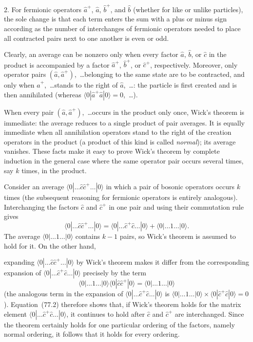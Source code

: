 2. For fermionic operators $\hat a^+$, $\hat a$, $\hat b^+$, and $\hat b$ (whether for like or unlike particles), the sole change is that each term enters the sum with a plus or minus sign according as the number of interchanges of fermionic operators needed to place all contracted pairs next to one another is even or odd.

Clearly, an average can be nonzero only when every factor $\hat a$, $\hat b$, or $\hat c$ in the product is accompanied by a factor $\hat a^+$, $\hat b^+$, or $\hat c^+$, respectively. Moreover, only operator pairs $(\hat a,\hat a^+)$,~\ldots belonging to the same state are to be contracted, and only when $\hat a^+$,~\ldots stands to the right of $\hat a$,~\ldots: the particle is first created and is then annihilated (whereas $\langle0|\hat a^+\hat a|0\rangle=0$,~\ldots).

When every pair $(\hat a,\hat a^+)$,~\ldots occurs in the product only once, Wick's theorem is immediate: the average reduces to a single product of pair averages. It is equally immediate when all annihilation operators stand to the right of the creation operators in the product (a product of this kind is called \emph{normal}); its average vanishes. These facts make it easy to prove Wick's theorem by complete induction in the general case where the same operator pair occurs several times, say $k$ times, in the product.

Consider an average $\langle0|\ldots\hat c\hat c^+\ldots|0\rangle$ in which a pair of bosonic operators occurs $k$ times (the subsequent reasoning for fermionic operators is entirely analogous). Interchanging the factors $\hat c$ and $\hat c^+$ in one pair and using their commutation rule gives
\begin{equation}
\langle0|\ldots\hat c\hat c^+\ldots|0\rangle
=\langle0|\ldots\hat c^+\hat c\ldots|0\rangle+\langle0|\ldots1\ldots|0\rangle.
\tag{77.2}
\end{equation}
The average $\langle0|\ldots1\ldots|0\rangle$ contains $k-1$ pairs, so Wick's theorem is assumed to hold for it. On the other hand,

expanding $\langle0|\ldots\hat c\hat c^+\ldots|0\rangle$ by Wick's theorem makes it differ from the corresponding expansion of $\langle0|\ldots\hat c^+\hat c\ldots|0\rangle$ precisely by the term
\[
\langle0|\ldots1\ldots|0\rangle\langle0|\hat c\hat c^+|0\rangle
=\langle0|\ldots1\ldots|0\rangle
\]
(the analogous term in the expansion of $\langle0|\ldots\hat c^+\hat c\ldots|0\rangle$ is $\langle0|\ldots1\ldots|0\rangle\times\langle0|\hat c^+\hat c|0\rangle=0$). Equation~(77.2) therefore shows that, if Wick's theorem holds for the matrix element $\langle0|\ldots\hat c^+\hat c\ldots|0\rangle$, it continues to hold after $\hat c$ and $\hat c^+$ are interchanged. Since the theorem certainly holds for one particular ordering of the factors, namely normal ordering, it follows that it holds for every ordering.

